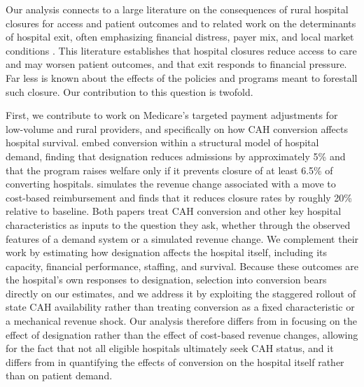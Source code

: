 \documentclass[a4paper, 12pt, twoside]{article}
\begin{document}
Our analysis connects to a large literature on the consequences of rural hospital closures for access and patient outcomes \citep{buchmueller2006, holmes2006, lindrooth2003, hsia2011, gujral2019, chandra2023-nber31789, chatterji2024} and to related work on the determinants of hospital exit, often emphasizing financial distress, payer mix, and local market conditions \citep{sloan2003, harrison2007}. This literature establishes that hospital closures reduce access to care and may worsen patient outcomes, and that exit responds to financial pressure. Far less is known about the effects of the policies and programs meant to forestall such closure. Our contribution to this question is twofold.

First, we contribute to work on Medicare's targeted payment adjustments for low-volume and rural providers, and specifically on how CAH conversion affects hospital survival. \cite{gowrisankaran2018} embed conversion within a structural model of hospital demand, finding that designation reduces admissions by approximately 5\% and that the program raises welfare only if it prevents closure of at least 6.5\% of converting hospitals. \cite{carroll2025} simulates the revenue change associated with a move to cost-based reimbursement and finds that it reduces closure rates by roughly 20\% relative to baseline. Both papers treat CAH conversion and other key hospital characteristics as inputs to the question they ask, whether through the observed features of a demand system or a simulated revenue change. We complement their work by estimating how designation affects the hospital itself, including its capacity, financial performance, staffing, and survival. Because these outcomes are the hospital's own responses to designation, selection into conversion bears directly on our estimates, and we address it by exploiting the staggered rollout of state CAH availability rather than treating conversion as a fixed characteristic or a mechanical revenue shock. Our analysis therefore differs from \cite{carroll2025} in focusing on the effect of designation rather than the effect of cost-based revenue changes, allowing for the fact that not all eligible hospitals ultimately seek CAH status, and it differs from \cite{gowrisankaran2018} in quantifying the effects of conversion on the hospital itself rather than on patient demand.
\end{document}
